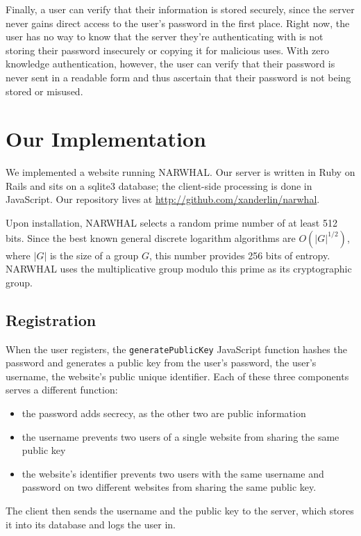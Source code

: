 \documentclass[11pt]{article}
\begin{document}
Finally, a user can verify that their information is stored securely, since the server never gains direct access to the user's password in the first place.  Right now, the user has no way to know that the server they're authenticating with is not storing their password insecurely or copying it for malicious uses.  With zero knowledge authentication, however, the user can verify that their password is never sent in a readable form and thus ascertain that their password is not being stored or misused.

\section{Our Implementation}

We implemented a website running NARWHAL. Our server is written in Ruby on Rails and sits on a sqlite3 database; the client-side processing is done in JavaScript. Our repository lives at \url{http://github.com/xanderlin/narwhal}.

Upon installation, NARWHAL selects a random prime number of at least 512 bits.  Since the best known general discrete logarithm algorithms are $O(|G|^{1/2})$, where $|G|$ is the size of a group $G$, this number provides 256 bits of entropy.\cite{Adleman}  NARWHAL uses the multiplicative group modulo this prime as its cryptographic group.

\subsection{Registration}

When the user registers, the \texttt{generatePublicKey} JavaScript function hashes the password and generates a public key from the user's password, the user's username, the website's public unique identifier. Each of these three components serves a different function:
\begin{itemize}
  \item the password adds secrecy, as the other two are public information
  \item the username prevents two users of a single website from sharing the same public key
  \item the website's identifier prevents two users with the same username and password on two different websites from sharing the same public key.
\end{itemize}

The client then sends the username and the public key to the server, which stores it into its database and logs the user in.
\end{document}
